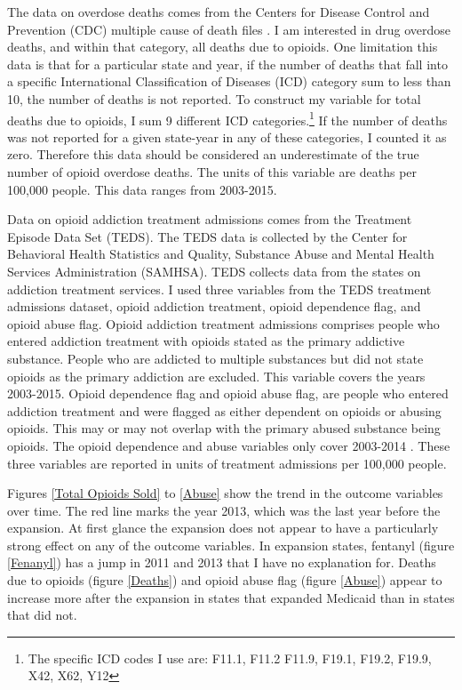 \documentclass[11pt]{article}
\begin{document}
The data on overdose deaths comes from the Centers for Disease Control and Prevention (CDC) multiple cause of death files \citep{CentersforDiseaseControlandPrevention2017}.  I am interested in drug overdose deaths, and within that category, all deaths due to opioids.  One limitation this data is that for a particular state and year, if the number of deaths that fall into a specific International Classification of Diseases (ICD) category sum to less than 10, the number of deaths is not reported.  To construct my variable for total deaths due to opioids, I sum 9 different ICD categories.\footnote{The specific ICD codes I use are: F11.1, F11.2 F11.9, F19.1, F19.2, F19.9, X42, X62, Y12}  If the number of deaths was not reported for a given state-year in any of these categories, I counted it as zero.  Therefore this data should be considered an underestimate of the true number of opioid overdose deaths.  The units of this variable are deaths per 100,000 people. This data ranges from 2003-2015.  

Data on opioid addiction treatment admissions comes from the Treatment Episode Data Set (TEDS). The TEDS data is collected by the Center for Behavioral Health Statistics and Quality, Substance Abuse and Mental Health Services Administration (SAMHSA).  TEDS collects data from the states on addiction treatment services.  I used three variables from the TEDS treatment admissions dataset, opioid addiction treatment, opioid dependence flag, and opioid abuse flag.  Opioid addiction treatment admissions comprises people who entered addiction treatment with opioids stated as the primary addictive substance.  People who are addicted to multiple substances but did not state opioids as the primary addiction are excluded. This variable covers the years 2003-2015.  Opioid dependence flag and opioid abuse flag, are people who entered addiction treatment and were flagged as either dependent on opioids or abusing opioids.  This may or may not overlap with the primary abused substance being opioids.  The opioid dependence and abuse variables only cover 2003-2014 \citep{SubstanceAbuseandMentalHealthServicesAdministration1015}.  These three variables are reported in units of treatment admissions per 100,000 people.


Figures \ref{Total Opioids Sold} to \ref{Abuse} 
show the trend in the outcome variables over time.  The red line marks the year 2013, which was the last year before the expansion.  At first glance the expansion does not appear to have a particularly strong effect on any of the outcome variables. In expansion states, fentanyl (figure \ref{Fenanyl}) has a jump in 2011 and 2013 that I have no explanation for. Deaths due to opioids (figure \ref{Deaths}) and opioid abuse flag (figure \ref{Abuse}) appear to increase more after the expansion in states that expanded Medicaid than in states that did not.  
\end{document}
